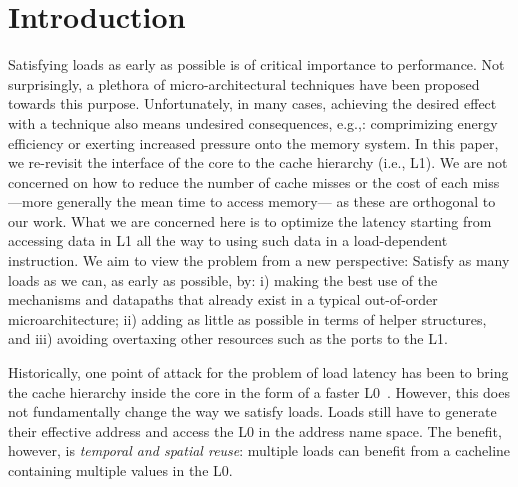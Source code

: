 \documentclass{sig-alternate}
\begin{document}
\section{Introduction}
Satisfying loads as early as possible is of critical importance to performance. Not surprisingly, a plethora of micro-architectural techniques have been proposed towards this purpose. Unfortunately, in many cases, achieving the desired effect with a technique also means undesired consequences, e.g.,: comprimizing energy efficiency or exerting increased pressure onto the memory system. 
In this paper, we re-revisit the interface of the core to the cache hierarchy (i.e., L1). We are not concerned on how to reduce the number of cache misses or the cost of each miss ---more generally the mean time to access memory--- as these are orthogonal to our work. What we are concerned here is to optimize the latency starting from accessing data in L1 all the way to using such data in a load-dependent instruction. We aim to view the problem from a new perspective: Satisfy as many loads as we can, as early as possible, by: i) making the best use of the mechanisms and datapaths that already exist in a typical out-of-order microarchitecture; ii) adding as little as possible in terms of helper structures, and iii) avoiding overtaxing other resources such as the ports to the L1.

Historically, one point of attack for the problem of load latency has been to bring the cache hierarchy inside the core in the form of a faster L0~\cite{}. However, this does not fundamentally change the way we satisfy loads.  Loads still have to generate their effective address and access the L0 in the address name space. The benefit, however, is \emph{temporal and spatial reuse}: multiple loads can benefit from a cacheline containing multiple values in the L0.
\end{document}
